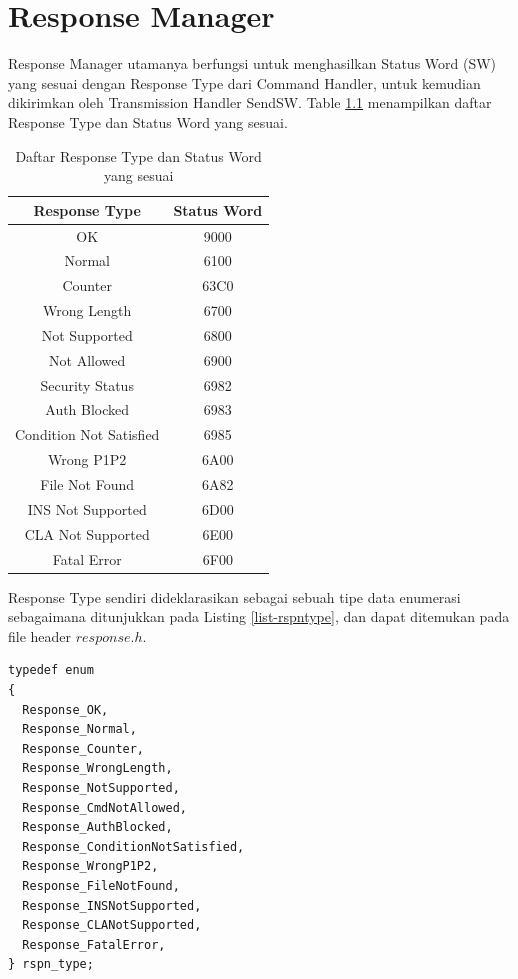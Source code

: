 \chapter{Response Manager}
\label{chap_state}

Response Manager utamanya berfungsi untuk menghasilkan Status Word (SW) yang sesuai dengan Response Type dari Command Handler, untuk kemudian dikirimkan oleh Transmission Handler SendSW. Table \ref{tabel-swlist} menampilkan daftar Response Type dan Status Word yang sesuai.

\begin{table}[h]
  \centering
  \begin{tabular}{|c|c|}
    \hline
    Response Type & Status Word \\
    \hline
    OK & 9000 \\
    Normal & 6100 \\
    Counter & 63C0 \\
    Wrong Length & 6700 \\
    Not Supported & 6800 \\
    Not Allowed & 6900 \\
    Security Status & 6982 \\
    Auth Blocked & 6983 \\
    Condition Not Satisfied & 6985 \\
    Wrong P1P2 & 6A00 \\
    File Not Found & 6A82 \\
    INS Not Supported & 6D00 \\
    CLA Not Supported & 6E00 \\
    Fatal Error & 6F00 \\
    \hline
  \end{tabular}
  \caption{Daftar Response Type dan Status Word yang sesuai}
  \label{tabel-swlist}
\end{table}

Response Type sendiri dideklarasikan sebagai sebuah tipe data enumerasi sebagaimana ditunjukkan pada Listing \ref{list-rspntype}, dan dapat ditemukan pada file header $response.h$.

\begin{lstlisting}[caption={Tipe Data Enumerasi Response Type}, label={list-rspntype}]
typedef enum
{
  Response_OK,
  Response_Normal,
  Response_Counter,
  Response_WrongLength,
  Response_NotSupported,
  Response_CmdNotAllowed,
  Response_AuthBlocked,
  Response_ConditionNotSatisfied,
  Response_WrongP1P2,
  Response_FileNotFound,
  Response_INSNotSupported,
  Response_CLANotSupported,
  Response_FatalError,
} rspn_type;
\end{lstlisting}

